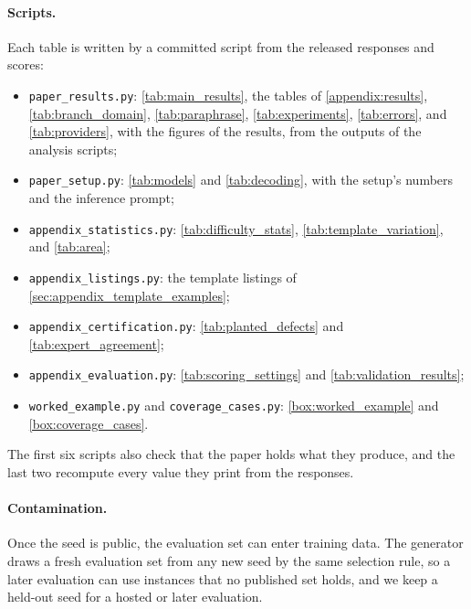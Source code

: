 \paragraph{Scripts.} Each table is written by a committed script from the released responses and
scores:
\begin{itemize}[nosep, leftmargin=*]
\item \texttt{paper\_results.py}: \autoref{tab:main_results}, the tables of
\autoref{appendix:results}, \autoref{tab:branch_domain}, \autoref{tab:paraphrase},
\autoref{tab:experiments}, \autoref{tab:errors}, and \autoref{tab:providers}, with the figures of
the results, from the outputs of the analysis scripts;
\item \texttt{paper\_setup.py}: \autoref{tab:models} and \autoref{tab:decoding}, with the setup's
numbers and the inference prompt;
\item \texttt{appendix\_statistics.py}: \autoref{tab:difficulty_stats},
\autoref{tab:template_variation}, and \autoref{tab:area};
\item \texttt{appendix\_listings.py}: the template listings of
\autoref{sec:appendix_template_examples};
\item \texttt{appendix\_certification.py}: \autoref{tab:planted_defects} and
\autoref{tab:expert_agreement};
\item \texttt{appendix\_evaluation.py}: \autoref{tab:scoring_settings} and
\autoref{tab:validation_results};
\item \texttt{worked\_example.py} and \texttt{coverage\_cases.py}: \autoref{box:worked_example}
and \autoref{box:coverage_cases}.
\end{itemize}
The first six scripts also check that the paper holds what they produce, and the last two recompute
every value they print from the responses.

\paragraph{Contamination.} Once the seed is public, the evaluation set can enter training data.
The generator draws a fresh evaluation set from any new seed by the same selection rule, so a later
evaluation can use instances that no published set holds, and we keep a held-out seed for a hosted
or later evaluation.
